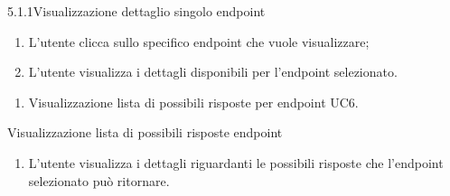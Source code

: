 \begin{usecase}{5.1.1}{Visualizzazione dettaglio singolo endpoint}\label{uc:visualizzazione-dettaglio-singolo-endpoint}

    \usecasemain{}
        \begin{enumerate}
            \item L'utente clicca sullo specifico endpoint che vuole visualizzare;
            \item L'utente visualizza i dettagli disponibili per l'endpoint selezionato.
        \end{enumerate}

    \usecaseext{}
        \begin{enumerate}
            \item Visualizzazione lista di possibili risposte per endpoint UC6.
        \end{enumerate}

\end{usecase}


\begin{usecase}{6}{Visualizzazione lista di possibili risposte endpoint}\label{uc:visualizzazione-risposte-endpoint}

    \usecasemain{}
        \begin{enumerate}
            \item L'utente visualizza i dettagli riguardanti le possibili risposte che l'endpoint selezionato può ritornare.
        \end{enumerate}

\end{usecase}


